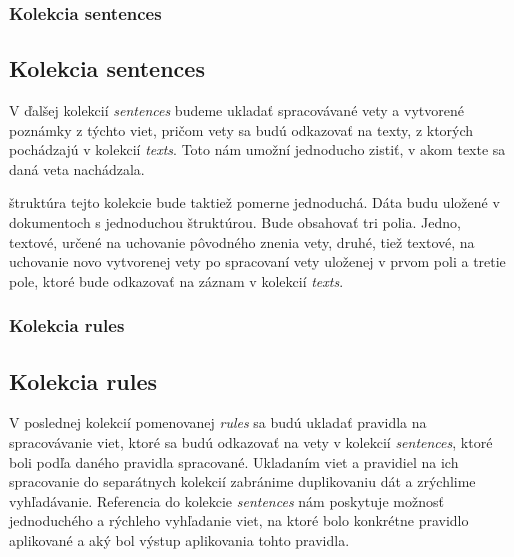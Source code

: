 %
%
{
	\subsubsection{Kolekcia sentences}
}
{
	\subsection{Kolekcia sentences}
}
V ďalšej kolekcií \textit{sentences} budeme ukladať spracovávané vety a vytvorené poznámky z týchto viet, pričom vety sa budú odkazovať na texty, z ktorých pochádzajú v kolekcií \textit{texts}. Toto nám umožní jednoducho zistiť, v akom texte sa daná veta nachádzala.

štruktúra tejto kolekcie bude taktiež pomerne jednoduchá. Dáta budu uložené v dokumentoch s jednoduchou štruktúrou. Bude obsahovať tri polia. Jedno, textové, určené na uchovanie pôvodného znenia vety, druhé, tiež textové, na uchovanie novo vytvorenej vety po spracovaní vety uloženej v prvom poli a tretie pole, ktoré bude odkazovať na záznam v kolekcií \textit{texts}.

%
%
{
	\subsubsection{Kolekcia rules}
}
{
	\subsection{Kolekcia rules}
}
V poslednej kolekcií pomenovanej \textit{rules} sa budú ukladať pravidla na spracovávanie viet, ktoré sa budú odkazovať na vety v kolekcií \textit{sentences}, ktoré boli podľa daného pravidla spracované. Ukladaním viet a pravidiel na ich spracovanie do separátnych kolekcií zabránime duplikovaniu dát a zrýchlime vyhľadávanie. Referencia do kolekcie \textit{sentences} nám poskytuje možnosť jednoduchého a rýchleho vyhľadanie viet, na ktoré bolo konkrétne pravidlo aplikované a aký bol výstup aplikovania tohto pravidla.

